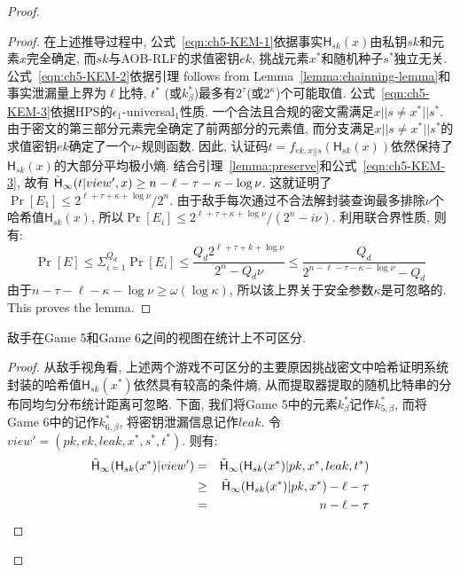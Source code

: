 \begin{proof}
\begin{proof}
在上述推导过程中, 公式~\eqref{eqn:ch5-KEM-1}依据事实$\mathsf{H}_{sk}(x)$由私钥$sk$和元素$x$完全确定, 
而$sk$与AOB-RLF的求值密钥$ek$, 挑战元素$x^*$和随机种子$s^*$独立无关.  
公式~\eqref{eqn:ch5-KEM-2}依据引理 follows from Lemma~\ref{lemma:chainning-lemma}和事实泄漏量上界为$\ell$比特, $t^*$ (或$k_\beta^*$)最多有$2^{\tau}$(或$2^\kappa$)个可能取值. 
公式~\eqref{eqn:ch5-KEM-3}依据HPS的$\epsilon_1$-universal$_1$性质. 一个合法且合规的密文需满足$x||s \neq x^*||s^*$. 由于密文的第三部分元素完全确定了前两部分的元素值, 而分支满足$x||s \neq x^*||s^*$的求值密钥$ek$确定了一个$\nu$-规则函数. 因此, 认证码$t = f_{ek, x||s}(\mathsf{H}_{sk}(x))$依然保持了$\mathsf{H}_{sk}(x)$的大部分平均极小熵. 结合引理~\ref{lemma:preserve}和公式~\eqref{eqn:ch5-KEM-3}, 故有
$\tilde{\mathsf{H}}_\infty(t|view', x) \geq n - \ell - \tau - \kappa -\log \nu$.   
这就证明了$\Pr[E_1] \leq 2^{\ell + \tau + \kappa + \log \nu}/2^{n}$. 由于敌手每次通过不合法解封装查询最多排除$\nu$个哈希值$\mathsf{H}_{sk}(x)$, 所以$\Pr[E_i] \leq 2^{\ell + \tau + \kappa + \log \nu}/(2^n- i\nu)$. 利用联合界性质, 则有: 
\begin{equation*}
    \Pr[E] \leq \Sigma_{i=1}^{Q_d} \Pr[E_i] \leq \frac{Q_d 2^{\ell + \tau + k + \log \nu}}{2^n-Q_d \nu} 
    \leq \frac{Q_d}{2^{n-\ell-\tau-\kappa-\log \nu} - Q_d}
\end{equation*}
由于$n - \tau - \ell - \kappa - \log \nu \geq \omega(\log \kappa)$, 所以该上界关于安全参数$\kappa$是可忽略的. 
This proves the lemma. 
\end{proof}

\begin{lemma}
敌手在Game 5和Game 6之间的视图在统计上不可区分.
\end{lemma}
\begin{proof}
从敌手视角看, 上述两个游戏不可区分的主要原因挑战密文中哈希证明系统封装的哈希值$\mathsf{H}_{sk}(x^*)$依然具有较高的条件熵, 从而提取器提取的随机比特串的分布同均匀分布统计距离可忽略. 下面, 我们将Game 5中的元素$k_\beta^*$记作$k_{5,\beta}^*$, 而将Game 6中的记作$k_{6,\beta}^*$, 将密钥泄漏信息记作$leak$. 令$view' = (pk, ek, leak, x^*, s^*, t^*)$. 则有:
\begin{eqnarray}
\tilde{\mathsf{H}}_\infty(\mathsf{H}_{sk}(x^*)|view') & = & \tilde{\mathsf{H}}_\infty(\mathsf{H}_{sk}(x^*)|pk, x^*, leak, t^*) \label{eqn:KEM-4}\\
                    & \geq & \tilde{\mathsf{H}}_\infty(\mathsf{H}_{sk}(x^*)|pk, x^*) - \ell - \tau \label{eqn:KEM-5}\\
                    & = & n - \ell - \tau \label{eqn:KEM-6}
\end{eqnarray}


\end{proof}
\end{proof}
